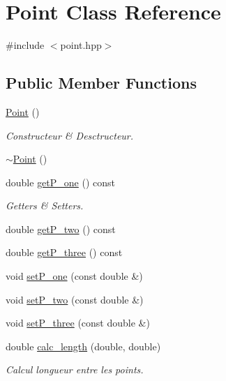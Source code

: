 \hypertarget{class_point}{\section{Point Class Reference}
\label{class_point}
}


{\ttfamily \#include $<$point.\-hpp$>$}

\subsection*{Public Member Functions}
\begin{DoxyCompactItemize}
\item 
\hyperlink{class_point_ad92f2337b839a94ce97dcdb439b4325a}{Point} ()
\begin{DoxyCompactList}\small\item\em Constructeur \& Desctructeur. \end{DoxyCompactList}\item 
\hyperlink{class_point_a395fa04b4ec126b66fc053f829a30cc1}{$\sim$\-Point} ()
\item 
double \hyperlink{class_point_a211f8dee098122a2f1c326ba42652ee2}{get\-P\-\_\-one} () const 
\begin{DoxyCompactList}\small\item\em Getters \& Setters. \end{DoxyCompactList}\item 
double \hyperlink{class_point_afd9ee8dca2913903fd6a1a95d743afaa}{get\-P\-\_\-two} () const 
\item 
double \hyperlink{class_point_adf0f89d9beca24315b45d96786896a56}{get\-P\-\_\-three} () const 
\item 
void \hyperlink{class_point_aea96dfedc04450f20928929fc1357ba6}{set\-P\-\_\-one} (const double \&)
\item 
void \hyperlink{class_point_a282784b2c6669e5270b9ec447f6e9dc1}{set\-P\-\_\-two} (const double \&)
\item 
void \hyperlink{class_point_aa46638c8c613fa6192272d4a4168f503}{set\-P\-\_\-three} (const double \&)
\item 
double \hyperlink{class_point_a5cb059b4e16aca7ca375076971d90521}{calc\-\_\-length} (double, double)
\begin{DoxyCompactList}\small\item\em Calcul longueur entre les points. \end{DoxyCompactList}\end{DoxyCompactItemize}


